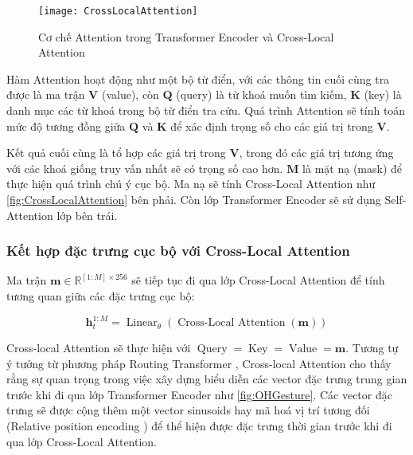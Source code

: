 \begin{figure}[H]
	\centering
	\texttt{[image: CrossLocalAttention]}
	\caption{Cơ chế Attention trong Transformer Encoder và Cross-Local Attention}
	\label{fig:CrossLocalAttention}
\end{figure}


Hàm Attention hoạt động như một bộ từ điển, với các thông tin cuối cùng tra được là ma trận $\mathbf{V}$ (value), còn $\mathbf{Q}$ (query) là từ khoá muốn tìm kiếm, $\mathbf{K}$ (key) là danh mục các từ khoá trong bộ từ điển tra cứu. Quá trình Attention sẽ tính toán mức độ tương đồng giữa \( \mathbf{Q} \) và \( \mathbf{K} \) để xác định trọng số cho các giá trị trong \( \mathbf{V} \). 

Kết quả cuối cùng là tổ hợp các giá trị trong \( \mathbf{V} \), trong đó các giá trị tương ứng với các khoá giống truy vấn nhất sẽ có trọng số cao hơn. $\mathbf{M}$ là mặt nạ (mask) để thực hiện quá trình chú ý cục bộ. Ma nạ sẽ tính Cross-Local Attention như \autoref{fig:CrossLocalAttention} bên phải. Còn lớp Transformer Encoder sẽ sử dụng Self-Attention lớp bên trái.

\subsubsection{Kết hợp đặc trưng cục bộ với Cross-Local Attention}

Ma trận $\mathbf{m} \in \mathbb{R}^{[1:M] \times 256}$ sẽ tiếp tục đi qua lớp Cross-Local Attention để tính tương quan giữa các đặc trưng cục bộ: 

\begin{equation}
	\mathbf{h}^{1:M}_{t}  = \operatorname{Linear}_{\theta}  ( \operatorname{Cross-Local\ Attention}( \mathbf{m}) )
	\label{eq:CrossLocalAttention}
\end{equation}

Cross-local Attention sẽ thực hiện với $\operatorname{Query} = \operatorname{Key} = \operatorname{Value} = \mathbf{m}$. 
Tương tự ý tưởng từ phương pháp Routing Transformer \cite{roy2021efficient}, Cross-local Attention cho thấy rằng sự quan trọng trong việc xây dựng biểu diễn các vector đặc trưng trung gian trước khi đi qua lớp Transformer Encoder như \autoref{fig:OHGesture}. 
Các vector đặc trưng sẽ được cộng thêm một vector sinusoids hay mã hoá vị trí tương đối (Relative position encoding \cite{vaswani2017attention}) để thể hiện được đặc trưng thời gian trước khi đi qua lớp Cross-Local Attention.


